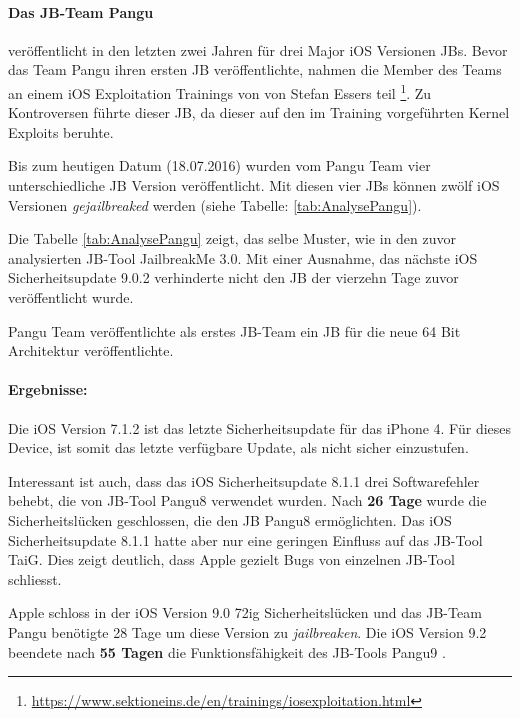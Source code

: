 \paragraph{Das JB-Team Pangu} veröffentlicht in den letzten zwei Jahren für drei Major iOS Versionen JBs. Bevor das Team Pangu ihren ersten JB veröffentlichte, nahmen die Member des Teams an einem iOS Exploitation Trainings von von Stefan Essers teil \footnote{\url{https://www.sektioneins.de/en/trainings/iosexploitation.html}}. Zu Kontroversen führte dieser JB, da dieser auf den im Training vorgeführten Kernel Exploits beruhte.\par
Bis zum heutigen Datum (18.07.2016) wurden vom Pangu Team vier unterschiedliche JB Version veröffentlicht. Mit diesen vier JBs können zwölf iOS Versionen \textit{\glqq gejailbreaked\grqq{}} werden (siehe Tabelle: \ref{tab:AnalysePangu}).

Die Tabelle \ref{tab:AnalysePangu} zeigt, das selbe Muster, wie in den zuvor analysierten JB-Tool JailbreakMe 3.0. Mit einer Ausnahme, das nächste iOS Sicherheitsupdate 9.0.2 verhinderte nicht den JB der vierzehn Tage zuvor veröffentlicht wurde. \par 
Pangu Team veröffentlichte als erstes JB-Team ein JB für die neue 64 Bit Architektur veröffentlichte. 
\paragraph{Ergebnisse:}  Die iOS Version 7.1.2 ist das letzte Sicherheitsupdate für das iPhone 4. Für dieses Device, ist somit das letzte verfügbare Update, als nicht sicher einzustufen. \par 
Interessant ist auch, dass das iOS Sicherheitsupdate 8.1.1 drei Softwarefehler behebt, die von JB-Tool Pangu8 verwendet wurden. Nach \textbf{26 Tage} wurde die Sicherheitslücken geschlossen, die den JB Pangu8 ermöglichten. Das iOS Sicherheitsupdate 8.1.1 hatte aber nur eine geringen Einfluss auf das JB-Tool TaiG. Dies zeigt deutlich, dass Apple gezielt Bugs von einzelnen JB-Tool schliesst. 

Apple schloss in der iOS Version 9.0 72ig Sicherheitslücken und das JB-Team Pangu benötigte 28 Tage um diese Version zu \textit{\glqq jailbreaken\grqq{}}. Die iOS Version 9.2 beendete nach \textbf{55 Tagen} die Funktionsfähigkeit des JB-Tools Pangu9 .

